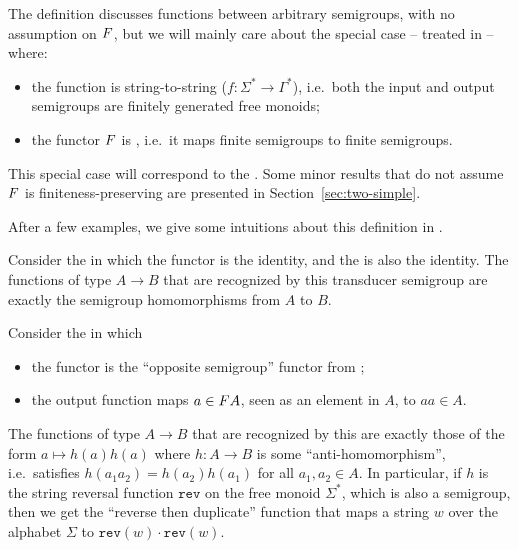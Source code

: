 \AP The definition discusses functions between arbitrary semigroups, with no
assumption on $\functor$, but we will
mainly care about the special case -- treated in  -- where:
\begin{itemize}
\item the function is string-to-string ($f\colon\Sigma^*\to\Gamma^*$), i.e.\
  both the input and output semigroups are finitely generated free monoids;
\item the functor $\functor$ is
  , i.e.~it maps finite semigroups to finite
  semigroups.
\end{itemize}
This special case will correspond to the . Some
minor results that do not assume $\functor$ is finiteness-preserving are presented in Section~\ref{sec:two-simple}.

After a few examples, we give some intuitions about this definition in .

\begin{example}
 Consider the  in which the functor is the identity, and the  is also the identity. The functions of type $A \to B$ that are recognized by this transducer semigroup are exactly the semigroup homomorphisms from $A$ to $B$.
\end{example}

\begin{example}\label{ex:reverse-duplicate}
  Consider the  in which
  \begin{itemize}
  \item the functor is the \enquote{opposite semigroup} functor from
    \Cref{ex:functors};
  \item the output function maps $a\in\functor A$, seen as an element in $A$, to
    $aa \in A$.
  \end{itemize}
  The functions of type $A \to B$ that are recognized by this  are exactly those of the form $a \mapsto h(a)h(a)$ where $h\colon A
  \to B$ is some \enquote{anti-homomorphism}, i.e.\ satisfies
  $h(a_1a_2)=h(a_2)h(a_1)$ for all $a_1,a_2\in A$. In particular, if $h$ is the
  string reversal function $\mathtt{rev}$ on the free monoid $\Sigma^*$, which
  is also a semigroup, then we get the \enquote{reverse then duplicate} function
  that maps a string $w$ over the alphabet $\Sigma$ to $\mathtt{rev}(w) \cdot
  \mathtt{rev}(w)$.
\end{example}

